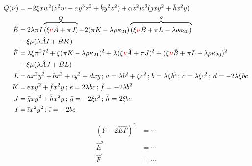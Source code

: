 \documentclass[12pt]{article}
\numberwithin{table}{section}
\begin{document}
\begin{align}
Q(\nu)&=-2\xi xw^2 (z^2 w - \alpha y^3 z^2 + \bar k y^2 z^2) + \alpha z^2w^3 (\bar g xy^2 + \bar h x^2 y)\\
\hat E &= 2\lambda \pi I\overbrace{(\xi {\color{red}\nu} \hat A + \pi J)}^{Q} + 2(\pi K - \lambda \rho \kappa_{21})\overbrace{(\xi {\color{red}\nu} \hat B + \pi L - \lambda \rho \kappa_{20})}^{S}  \nonumber\\
&- \xi \mu (\lambda \hat AI  + \hat BK  )\\
\hat F &= \lambda\xi \pi^2 I^2 +\xi (\pi K - \lambda \rho \kappa_{21})^2 + \lambda (\xi {\color{red}\nu} \hat A + \pi J)^2 + (\xi {\color{red}\nu} \hat B + \pi L - \lambda \rho \kappa_{20})^2 \nonumber\\
&- \xi \mu (\lambda \hat A J + \hat B L) \\
L &= \bar a x^2 y^2 + \bar b x^2 + \bar c y^2 + \bar d xy \,;\,\bar a = \lambda b^2 + \xi c^2\,;\,\bar b = \lambda \xi b^2\,;\,\bar c = \lambda \xi c^2\,;\,\bar d = -2 \lambda \xi bc \\
K &= \bar e xy^2 + \bar f x^2 y \,;\,\bar e = 2 \lambda bc \,;\,\bar f = -2\lambda b^2 \\
J &= \bar g xy^2 + \bar h x^2 y \,;\,\bar g = -2\xi c^2 \,;\,\bar h = 2\xi bc \\
I &= \bar \iota x^2 y^2 \,;\, \bar \iota = -2bc
\end{align}

\begin{align}
(Y - 2\hat E \hat F)^2 &= \cdots \\
\hat E^2 &= \cdots \\
\hat F^2 &= \cdots 
\end{align}
\end{document}
